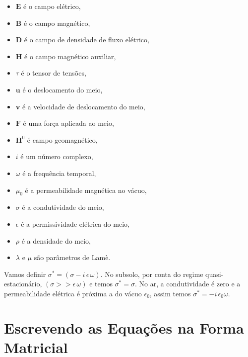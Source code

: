 \begin{itemize}
\item $\mathbf{{E}}$ \'e o campo el\'etrico,
\item $\mathbf{{B}}$ \'e o campo magn\'etico,
\item $\mathbf{{D}}$ \'e o campo de densidade de fluxo el\'etrico,
\item $\mathbf{{H}}$ \'e o campo magn\'etico auxiliar,
\item $\tau$ \'e o tensor de tens\~oes,
\item $\mathbf{{u}}$ \'e o deslocamento do meio,
\item $\mathbf{{v}}$ \'e a velocidade de deslocamento do meio,
\item $\mathbf{{F}}$ \'e uma for\c{c}a aplicada ao meio,
\item $\mathbf{H}^0$ \'e campo geomagn\'etico,
\item $i$ \'e um n\'umero complexo,
\item $\omega$ \'e a frequ\^encia temporal,
\item $\mu_0$ \'e a permeabilidade magn\'etica no v\'acuo,
\item $\sigma$ \'e a condutividade do meio,
\item $\epsilon$ \'e a permissividade el\'etrica do meio,
\item $\rho$ \'e a densidade do meio,
\item $\lambda$ e $\mu$ s\~ao par\^ametros de Lam\`e.
\end{itemize}
Vamos definir $\sigma^*=(\sigma-i\,\epsilon\,\omega)$. No subsolo, por conta do regime quasi-estacion\'ario, $(\sigma>>\epsilon\,\omega)$  e  temos $\sigma^*=\sigma$. No ar, a condutividade \'e zero e a permeabilidade el\'etrica \'e pr\'oxima a do v\'acuo $\epsilon_0$, assim temos $\sigma^*=-i\,\epsilon_0\omega$.

\section{Escrevendo as Equa\c{c}\~oes na Forma Matricial}

